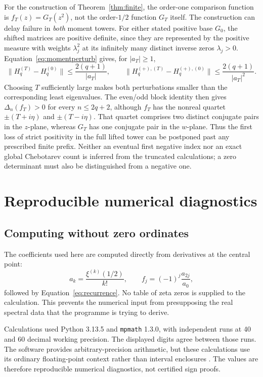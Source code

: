 \documentclass[11pt,letterpaper]{article}
\numberwithin{equation}{section}
\theoremstyle{definition}
\theoremstyle{remark}
\begin{document}
For the construction of Theorem~\ref{thm:finite}, the order-one comparison function is $f_T(z)=G_T(z^2)$, not the order-$1/2$ function $G_T$ itself. The construction can delay failure in \emph{both} moment towers. For either stated positive base $G_0$, the shifted matrices are positive definite, since they are represented by the positive measure with weights $\lambda_j^2$ at its infinitely many distinct inverse zeros $\lambda_j>0$. Equation~\eqref{eq:momentperturb} gives, for $|a_T|\geq1$,
\begin{equation}
 \|H_q^{(T)}-H_q^{(0)}\|\leq\frac{2(q+1)}{|a_T|},\qquad
 \|H_q^{(+),(T)}-H_q^{(+),(0)}\|\leq\frac{2(q+1)}{|a_T|^2}.
 \label{eq:twotowerperturbation}
\end{equation}
Choosing $T$ sufficiently large makes both perturbations smaller than the corresponding least eigenvalues. The even/odd block identity then gives $\Delta_n(f_T)>0$ for every $n\leq2q+2$, although $f_T$ has the nonreal quartet $\pm(T+i\eta)$ and $\pm(T-i\eta)$. That quartet comprises two distinct conjugate pairs in the $z$-plane, whereas $G_T$ has one conjugate pair in the $w$-plane. Thus the first loss of strict positivity in the full lifted tower can be postponed past any prescribed finite prefix. Neither an eventual first negative index nor an exact global Chebotarev count is inferred from the truncated calculations; a zero determinant must also be distinguished from a negative one.

\section{Reproducible numerical diagnostics}
\label{sec:numerics}
\subsection{Computing without zero ordinates}
The coefficients used here are computed directly from derivatives at the central point:
\begin{equation}
 a_k=\frac{\xi^{(k)}(1/2)}{k!},\qquad
 f_j=(-1)^j\frac{a_{2j}}{a_0},
 \label{eq:taylorcoeff}
\end{equation}
followed by Equation~\eqref{eq:recurrence}. No table of zeta zeros is supplied to the calculation. This prevents the numerical input from presupposing the real spectral data that the programme is trying to derive.

Calculations used Python 3.13.5 and \texttt{mpmath} 1.3.0, with independent runs at 40 and 60 decimal working precision. The displayed digits agree between those runs. The software provides arbitrary-precision arithmetic, but these calculations use its ordinary floating-point context rather than interval enclosures \cite{mpmath}. The values are therefore reproducible numerical diagnostics, not certified sign proofs.
\end{document}
